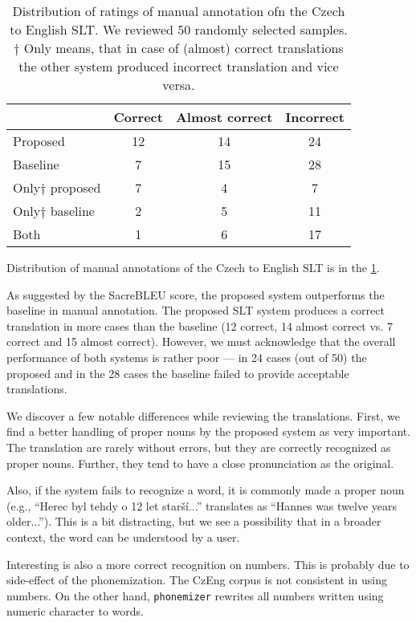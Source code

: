 \begin{table}[t]
	\centering
	\begin{tabular}{l|ccc}
		& Correct & Almost correct & Incorrect \\ \hline
		Proposed      & 12      & 14             & 24        \\
		Baseline      & 7       & 15             & 28        \\ \hline
		Only$\dagger$ proposed & 7       & 4              & 7         \\
		Only$\dagger$ baseline & 2       & 5              & 11        \\ \hline
		Both          & 1       & 6              & 17       
	\end{tabular}	\caption{Distribution of ratings of manual annotation ofn the Czech to English SLT. We reviewed 50 randomly selected samples.\\$\dagger$ Only means, that in case of (almost) correct translations the other system produced incorrect translation and vice versa.}
	\label{tab:manual_cs_en}
\end{table}

Distribution of manual annotations of the Czech to English SLT is in the \cref{tab:manual_cs_en}. 

As suggested by the SacreBLEU score, the proposed system outperforms the baseline in manual annotation. The proposed SLT system produces a correct translation in more cases than the baseline (12 correct, 14 almost correct vs. 7 correct and 15 almost correct). However, we must acknowledge that the overall performance of both systems is rather poor --- in 24 cases (out of 50) the proposed and in the 28 cases the baseline failed to provide acceptable translations.

We discover a few notable differences while reviewing the translations. First, we find a better handling of proper nouns by the proposed system as very important. The translation are rarely without errors, but they are correctly recognized as proper nouns. Further, they tend to have a close pronunciation as the original.

Also, if the system fails to recognize a word, it is commonly made a proper noun (e.g., ``Herec byl tehdy o 12 let starší...'' translates as ``Hannes was twelve years older...''). This is a bit distracting, but we see a possibility that in a broader context, the word can be understood by a user.

Interesting is also a more correct recognition on numbers. This is probably due to side-effect of the phonemization. The CzEng corpus is not consistent in using numbers. On the other hand, \texttt{phonemizer} rewrites all numbers written using numeric character to words.

